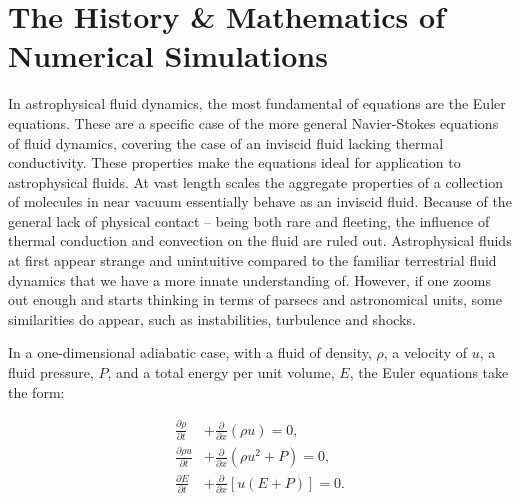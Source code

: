 \section{The History \& Mathematics of Numerical Simulations}
\label{sec:numerical-math}
\label{sec:numsim}

In astrophysical fluid dynamics, the most fundamental of equations are the Euler equations.
These are a specific case of the more general Navier-Stokes equations of fluid dynamics, covering the case of an inviscid fluid lacking thermal conductivity.
These properties make the equations ideal for application to astrophysical fluids.
At vast length scales the aggregate properties of a collection of molecules in near vacuum essentially behave as an inviscid fluid.
Because of the general lack of physical contact -- being both rare and fleeting, the influence of thermal conduction and convection on the fluid are ruled out.
Astrophysical fluids at first appear strange and unintuitive compared to the familiar terrestrial fluid dynamics that we have a more innate understanding of.
However, if one zooms out enough and starts thinking in terms of parsecs and astronomical units, some similarities do appear, such as instabilities, turbulence and shocks.

In a one-dimensional adiabatic case, with a fluid of density, $\rho$, a velocity of $u$, a fluid pressure, $P$, and a total energy per unit volume, $E$, the Euler equations take the form:

\begin{subequations}
  \begin{align}
    \frac{\partial \rho}{\partial t} & + \frac{\partial}{\partial x} (\rho u) = 0 ,\\
    \frac{\partial \rho u}{\partial t} & + \frac{\partial}{\partial x} (\rho u^2 + P) = 0 ,\\
    \frac{\partial E}{\partial t} & + \frac{\partial}{\partial x} \left[ u(E+P) \right] = 0 .
  \end{align}
\end{subequations}

